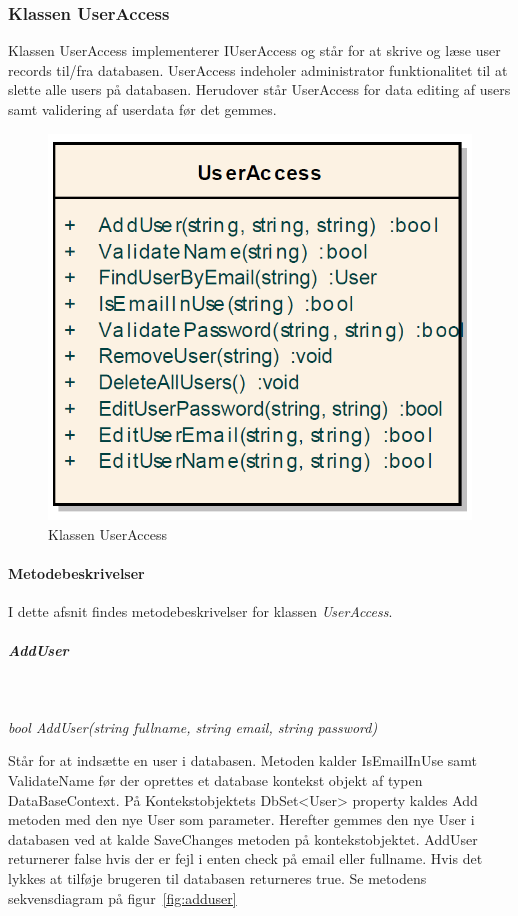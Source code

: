 \subsubsection{Klassen UserAccess}
Klassen UserAccess implementerer IUserAccess og står for at skrive og læse user records til/fra databasen.
UserAccess indeholer administrator funktionalitet til at slette alle users på databasen. Herudover står UserAccess for data editing af users samt validering af userdata før det gemmes.

\begin{figure}[H]
\centering
\includegraphics[width=0.4\linewidth]{figs/implementering/UserAccessClass.PNG}
\caption{Klassen UserAccess}
\label{fig:UserAccessClass}
\end{figure}


\paragraph{Metodebeskrivelser}
I dette afsnit findes metodebeskrivelser for klassen \textit{UserAccess}.

\subparagraph{AddUser}\

\textit{bool AddUser(string fullname, string email, string password)}

Står for at indsætte en user i databasen. Metoden kalder IsEmailInUse samt ValidateName før der oprettes et database kontekst objekt af typen DataBaseContext. På Kontekstobjektets DbSet<User> property kaldes Add metoden med den nye User som parameter. Herefter gemmes den nye User i databasen ved at kalde SaveChanges metoden på kontekstobjektet. AddUser returnerer false hvis der er fejl i enten check på email eller fullname. Hvis det lykkes at tilføje brugeren til databasen returneres true. Se metodens sekvensdiagram på figur~\ref{fig:adduser}

